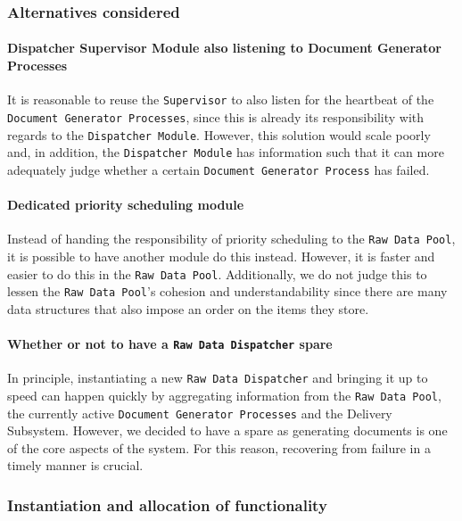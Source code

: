 \documentclass[a4paper,10pt]{article}
\begin{document}
\subsubsection*{Alternatives considered}
\paragraph{Dispatcher Supervisor Module also listening to Document Generator Processes}
It is reasonable to reuse the \texttt{Supervisor} to also listen for the heartbeat of the \texttt{Document Generator Processes}, since this is already its responsibility with regards to the \texttt{Dispatcher Module}. However, this solution would scale poorly and, in addition, the \texttt{Dispatcher Module} has information such that it can more adequately judge whether a certain \texttt{Document Generator Process} has failed.

\paragraph{Dedicated priority scheduling module}
Instead of handing the responsibility of priority scheduling to the \texttt{Raw Data Pool}, it is possible to have another module do this instead. However, it is faster and easier to do this in the \texttt{Raw Data Pool}. Additionally, we do not judge this to lessen the \texttt{Raw Data Pool}'s cohesion and understandability since there are many data structures that also impose an order on the items they store. 

\paragraph{Whether or not to have a \texttt{Raw Data Dispatcher} spare}
In principle, instantiating a new \texttt{Raw Data Dispatcher} and bringing it up to speed can happen quickly by aggregating information from the \texttt{Raw Data Pool}, the currently active \texttt{Document Generator Processes} and the Delivery Subsystem. However, we decided to have a spare as generating documents is one of the core aspects of the system. For this reason, recovering from failure in a timely manner is crucial.

\subsubsection{Instantiation and allocation of functionality}
\end{document}
